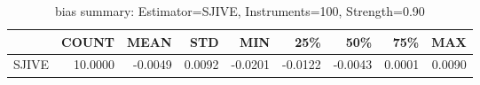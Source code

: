\begin{table}[ht]
\centering
\caption{bias summary: Estimator=SJIVE, Instruments=100, Strength=0.90}
\begin{tabular}{lrrrrrrrr}
\toprule
 & COUNT & MEAN & STD & MIN & 25\% & 50\% & 75\% & MAX \\
\midrule
SJIVE & 10.0000 & -0.0049 & 0.0092 & -0.0201 & -0.0122 & -0.0043 & 0.0001 & 0.0090 \\
\bottomrule
\end{tabular}
\end{table}
